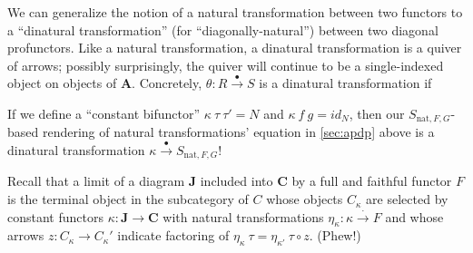 \documentclass[letterpaper]{article}
\begin{document}
We can generalize the notion of a natural transformation between two
functors to a ``dinatural transformation'' (for ``diagonally-natural'')
between two diagonal profunctors.  Like a natural transformation, a
dinatural transformation is a quiver of arrows; possibly surprisingly, the
quiver will continue to be a single-indexed object on objects of
$\mathbf{A}$.  Concretely, $\theta : R \stackrel{\bullet}{\to} S$ is a
dinatural transformation if
%
\begin{center}\end{center}

If we define a ``constant bifunctor'' $\kappa~\tau~\tau' = N$ and
$\kappa~f~g = id_N$, then our $S_{\text{nat},F,G}$-based rendering of
natural transformations' equation in \autoref{sec:apdp} above is a dinatural
transformation $\kappa \stackrel{\bullet}{\to} S_{\text{nat},F,G}$!

Recall that a limit of a diagram $\mathbf{J}$ included into $\mathbf{C}$ by
a full and faithful functor $F$ is the terminal object in the subcategory of
$C$ whose objects $C_\kappa$ are selected by constant functors $\kappa :
\mathbf{J} \to \mathbf{C}$ with natural transformations $\eta_\kappa :
\kappa \stackrel{\cdot}{\to} F$ and whose arrows $z : C_\kappa \to
C_\kappa'$ indicate factoring of $\eta_\kappa~\tau = \eta_{\kappa'}~\tau
\circ z$.  (Phew!)
\end{document}
